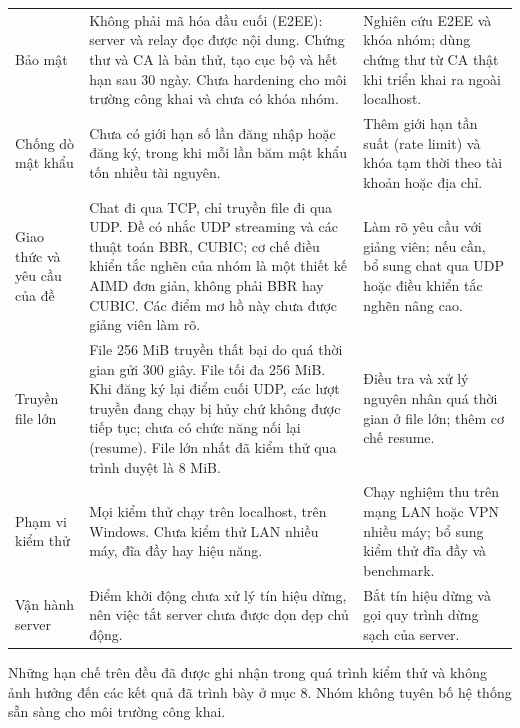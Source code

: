 \begin{xltabular}{\textwidth}{
    @{}
    >{\raggedright\arraybackslash}p{2.6cm}
    >{\raggedright\arraybackslash}X
    >{\raggedright\arraybackslash}X
    @{}
}
    \addlinespace

    Bảo mật
    & Không phải mã hóa đầu cuối (E2EE): server và relay đọc được nội dung. Chứng thư và CA là bản thử, tạo cục bộ và hết hạn sau 30 ngày. Chưa hardening cho môi trường công khai và chưa có khóa nhóm.
    & Nghiên cứu E2EE và khóa nhóm; dùng chứng thư từ CA thật khi triển khai ra ngoài localhost. \\

    \addlinespace

    Chống dò mật khẩu
    & Chưa có giới hạn số lần đăng nhập hoặc đăng ký, trong khi mỗi lần băm mật khẩu tốn nhiều tài nguyên.
    & Thêm giới hạn tần suất (rate limit) và khóa tạm thời theo tài khoản hoặc địa chỉ. \\

    \addlinespace

    Giao thức và yêu cầu của đề
    & Chat đi qua TCP, chỉ truyền file đi qua UDP. Đề có nhắc UDP streaming và các thuật toán BBR, CUBIC; cơ chế điều khiển tắc nghẽn của nhóm là một thiết kế AIMD đơn giản, không phải BBR hay CUBIC. Các điểm mơ hồ này chưa được giảng viên làm rõ.
    & Làm rõ yêu cầu với giảng viên; nếu cần, bổ sung chat qua UDP hoặc điều khiển tắc nghẽn nâng cao. \\

    \addlinespace

    Truyền file lớn
    & File 256 MiB truyền thất bại do quá thời gian gửi 300 giây. File tối đa 256 MiB. Khi đăng ký lại điểm cuối UDP, các lượt truyền đang chạy bị hủy chứ không được tiếp tục; chưa có chức năng nối lại (resume). File lớn nhất đã kiểm thử qua trình duyệt là 8 MiB.
    & Điều tra và xử lý nguyên nhân quá thời gian ở file lớn; thêm cơ chế resume. \\

    \addlinespace

    Phạm vi kiểm thử
    & Mọi kiểm thử chạy trên localhost, trên Windows. Chưa kiểm thử LAN nhiều máy, đĩa đầy hay hiệu năng.
    & Chạy nghiệm thu trên mạng LAN hoặc VPN nhiều máy; bổ sung kiểm thử đĩa đầy và benchmark. \\

    \addlinespace

    Vận hành server
    & Điểm khởi động chưa xử lý tín hiệu dừng, nên việc tắt server chưa được dọn dẹp chủ động.
    & Bắt tín hiệu dừng và gọi quy trình dừng sạch của server. \\

\end{xltabular}
\endgroup



Những hạn chế trên đều đã được ghi nhận trong quá trình kiểm thử và không ảnh hưởng đến các kết quả đã trình bày ở mục 8. Nhóm không tuyên bố hệ thống sẵn sàng cho môi trường công khai.